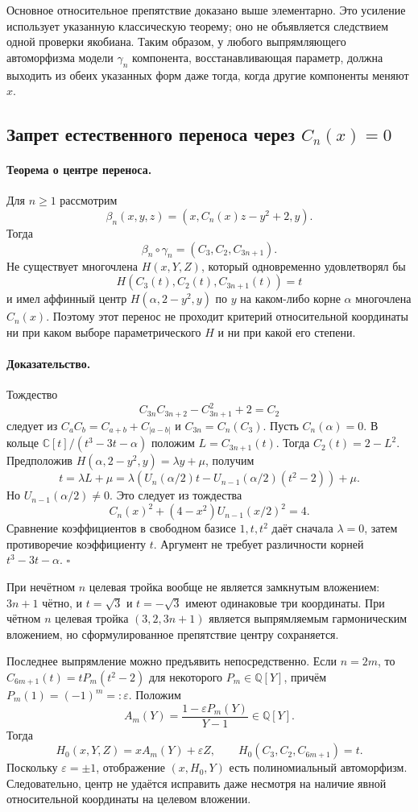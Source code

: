 Основное относительное препятствие доказано выше элементарно.
Это усиление использует указанную классическую теорему;
оно не объявляется следствием одной проверки якобиана.
Таким образом, у любого выпрямляющего автоморфизма модели $\gamma_n$
компонента, восстанавливающая параметр, должна выходить из обеих
указанных форм даже тогда, когда другие компоненты меняют $x$.

\subsection{Запрет естественного переноса через $C_n(x)=0$}

\paragraph{Теорема о центре переноса.}
Для $n\geq1$ рассмотрим
\[
 \beta_n(x,y,z)=(x,C_n(x)z-y^2+2,y).
\]
Тогда
\[
 \beta_n\circ\gamma_n=(C_3,C_2,C_{3n+1}).
\]
Не существует многочлена $H(x,Y,Z)$, который одновременно
удовлетворял бы
\[
 H(C_3(t),C_2(t),C_{3n+1}(t))=t
\]
и имел аффинный центр
$H(\alpha,2-y^2,y)$ по $y$ на каком-либо корне
$\alpha$ многочлена $C_n(x)$.
Поэтому этот перенос не проходит критерий относительной координаты
ни при каком выборе параметрического $H$ и ни при какой его степени.

\paragraph{Доказательство.}
Тождество
\[
 C_{3n}C_{3n+2}-C_{3n+1}^2+2=C_2
\]
следует из $C_aC_b=C_{a+b}+C_{|a-b|}$ и
$C_{3n}=C_n(C_3)$.
Пусть $C_n(\alpha)=0$. В кольце
$\mathbb C[t]/(t^3-3t-\alpha)$ положим
$L=C_{3n+1}(t)$. Тогда $C_2(t)=2-L^2$.
Предположив $H(\alpha,2-y^2,y)=\lambda y+\mu$, получим
\[
 t=\lambda L+\mu
 =\lambda\left(U_n(\alpha/2)t-
 U_{n-1}(\alpha/2)(t^2-2)\right)+\mu.
\]
Но $U_{n-1}(\alpha/2)\ne0$. Это следует из тождества
\[
 C_n(x)^2+(4-x^2)U_{n-1}(x/2)^2=4.
\]
Сравнение коэффициентов в свободном базисе $1,t,t^2$ даёт
сначала $\lambda=0$, затем противоречие коэффициенту $t$.
Аргумент не требует различности корней $t^3-3t-\alpha$.
\hfill$\square$

При нечётном $n$ целевая тройка вообще не является замкнутым
вложением: $3n+1$ чётно, и $t=\sqrt3$ и $t=-\sqrt3$ имеют
одинаковые три координаты. При чётном $n$ целевая тройка
$(3,2,3n+1)$ является выпрямляемым гармоническим вложением,
но сформулированное препятствие центру сохраняется.

Последнее выпрямление можно предъявить непосредственно.
Если $n=2m$, то $C_{6m+1}(t)=tP_m(t^2-2)$ для некоторого
$P_m\in\mathbb Q[Y]$, причём
$P_m(1)=(-1)^m=:\varepsilon$.
Положим
\[
 A_m(Y)=\frac{1-\varepsilon P_m(Y)}{Y-1}\in\mathbb Q[Y].
\]
Тогда
\[
 H_0(x,Y,Z)=xA_m(Y)+\varepsilon Z,
 \qquad H_0(C_3,C_2,C_{6m+1})=t.
\]
Поскольку $\varepsilon=\pm1$, отображение $(x,H_0,Y)$
есть полиномиальный автоморфизм. Следовательно, центр не удаётся
исправить даже несмотря на наличие явной относительной координаты
на целевом вложении.

